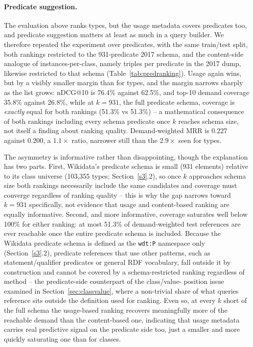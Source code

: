 \documentclass[sw]{iosart2x}
\begin{document}
\paragraph{\textbf{Predicate suggestion.}}
The evaluation above ranks types, but the usage metadata covers predicates too, and predicate
suggestion matters at least as much in a query builder. We therefore repeated the experiment over
predicates, with the same train/test split, both rankings restricted to the 931-predicate 2017
schema, and the content-side analogue of instances-per-class, namely triples per predicate in the
2017 dump, likewise restricted to that schema (Table~\ref{tab:predranking}). Usage again wins, but
by a visibly smaller margin than for types, and the margin narrows sharply as the list grows: nDCG@10
is 76.4\% against 62.5\%, and top-10 demand coverage 35.8\% against 26.8\%, while at $k=931$, the
full predicate schema, coverage is \emph{exactly} equal for both rankings (51.3\% vs 51.3\%) --
a mathematical consequence of both rankings including every schema predicate once $k$ reaches schema
size, not itself a finding about ranking quality. Demand-weighted MRR is $0.227$ against $0.200$, a
$1.1\times$ ratio, narrower still than the $2.9\times$ seen for types.

The asymmetry is informative rather than disappointing, though the explanation has two parts. First,
Wikidata's predicate schema is small (931 elements) relative to its class universe (103,355 types;
Section~\ref{s3}.2), so once $k$ approaches schema size both rankings necessarily include the same
candidates and coverage must converge regardless of ranking quality -- this is why the gap narrows
toward $k=931$ specifically, not evidence that usage and content-based ranking are equally informative.
Second, and more informative, coverage saturates well below 100\% for either ranking: at most 51.3\%
of demand-weighted test references are ever reachable once the entire predicate schema is included.
Because the Wikidata predicate schema is defined as the \texttt{wdt:P} namespace only
(Section~\ref{s3}.2), predicate references that use other patterns, such as statement/qualifier
predicates or general RDF vocabulary, fall outside it by construction and cannot be covered by a
schema-restricted ranking regardless of method -- the predicate-side counterpart of the class/value-
position issue examined in Section~\ref{sec:classvalue}, where a non-trivial share of what queries
reference sits outside the definition used for ranking. Even so, at every $k$ short of the full
schema the usage-based ranking recovers meaningfully more of the reachable demand than the
content-based one, indicating that usage metadata carries real predictive signal on the predicate
side too, just a smaller and more quickly saturating one than for classes.
\end{document}

